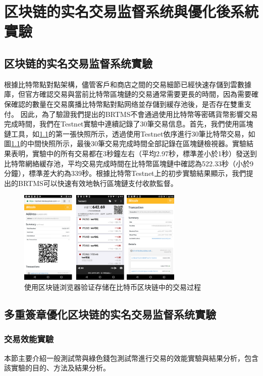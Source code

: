 
\chapter{区块链的实名交易监督系统與優化後系統實驗}

	\section{区块链的实名交易监督系统實驗}
	根據比特幣點對點架構，儘管客戶和商店之間的交易細節已經快速存儲到雲數據庫，但官方確認交易與當前比特幣區塊鏈的交易通常需要更長的時間，因為需要確保確認的數量在交易廣播比特幣點對點网络並存儲到緩存池後，是否存在雙重支付。
	因此，為了驗證我們提出的BRTMS不會通過使用比特幣等密碼貨幣影響交易完成時間，我們在Testnet實驗中連續記錄了30筆交易信息。首先，我們使用區塊鏈工具，如\ref{fig9}的第一張快照所示，透過使用Testnet依序進行30筆比特幣交易，如圖\ref{fig9}的中間快照所示，最後30筆交易完成時間全部記錄在區塊鏈檢視器。實驗結果表明，實驗中的所有交易都在3秒鐘左右（平均2.97秒，標準差小於1秒）發送到比特幣網絡緩存池，平均交易完成時間在比特幣區塊鏈中確認為522.33秒（小於9分鐘），標準差大約為339秒。根據比特幣Testnet上的初步實驗結果顯示，我們提出的BRTMS可以快速有效地執行區塊鏈支付收款監督。

	\begin{figure}[h]
		\centering
		\includegraphics[width = 0.7\textwidth]{fig9.png}
		\caption{使用区块链浏览器验证存储在比特币区块链中的交易过程}\label{fig9}
	\end{figure}

	\section{多重簽章優化区块链的实名交易监督系统實驗}
		\subsection{交易效能實驗}
		本節主要介紹一般測試幣與綠色錢包測試幣進行交易的效能實驗與結果分析，包含該實驗的目的、方法及結果分析。


